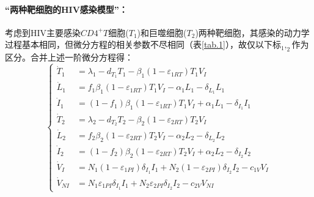 \documentclass{ctexart}
\begin{document}
\paragraph{“两种靶细胞的HIV感染模型”：}考虑到HIV主要感染$CD4^{+}T$细胞($T_{1}$)和巨噬细胞($T_{2}$)两种靶细胞，其感染的动力学过程基本相同，但微分方程的相关参数不尽相同（表\ref{tab.1}），故仅以下标$ _{1}, _{2}$作为区分。合并上述一阶微分方程得：
$$\left\{
    \begin{aligned}
        \dot{T}_{1}  & =\lambda_{1}-d_{T_{1}}T_{1}-\beta_{1} (1-\varepsilon _{1RT})T_{1}V_{I}                                       \\
        \dot{L}_{1}  & =f_{1}\beta_{1} (1-\varepsilon _{1RT})T_{1}V_{I}-\alpha_{1} L_{1}-\delta _{L_{1}}L_{1}                       \\
        \dot{I}_{1}  & =(1-f_{1})\beta_{1} (1-\varepsilon _{1RT})T_{1}V_{I}+\alpha_{1} L_{1}-\delta _{I_{1}}I_{1}                   \\
        \dot{T}_{2}  & =\lambda_{2}-d_{T_{2}}T_{2}-\beta_{2} (1-\varepsilon _{2RT})T_{2}V_{I}                                       \\
        \dot{L}_{2}  & =f_{2}\beta_{2} (1-\varepsilon _{2RT})T_{2}V_{I}-\alpha_{2} L_{2}-\delta _{L_{2}}L_{2}                       \\
        \dot{I}_{2}  & =(1-f_{2})\beta_{2} (1-\varepsilon _{2RT})T_{2}V_{I}+\alpha_{2} L_{2}-\delta _{I_{2}}I_{2}                   \\
        \dot{V}_{I}  & =N_{1}(1-\varepsilon _{1PI})\delta _{I_{1}}I_{1}+N_{2}(1-\varepsilon _{2PI})\delta _{I_{2}}I_{2}-c_{1V}V_{I} \\
        \dot{V}_{NI} & =N_{1}\varepsilon _{1PI}\delta _{I_{1}}I_{1}+N_{2}\varepsilon _{2PI}\delta _{I_{2}}I_{2}-c_{2V}V_{NI}
    \end{aligned}
    \right.$$
\end{document}
